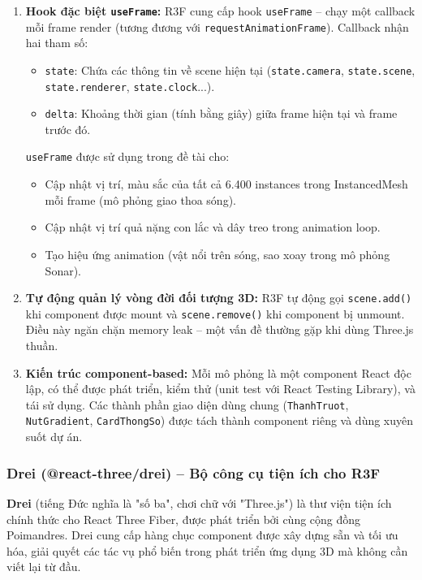 \begin{enumerate}
    \item \textbf{Hook đặc biệt \texttt{useFrame}:} R3F cung cấp hook \texttt{useFrame} – chạy một callback mỗi frame render (tương đương với \texttt{requestAnimationFrame}). Callback nhận hai tham số:
    \begin{itemize}
        \item \texttt{state}: Chứa các thông tin về scene hiện tại (\texttt{state.camera}, \texttt{state.scene}, \texttt{state.renderer}, \texttt{state.clock}...).
        \item \texttt{delta}: Khoảng thời gian (tính bằng giây) giữa frame hiện tại và frame trước đó.
    \end{itemize}
    \texttt{useFrame} được sử dụng trong đề tài cho:
    \begin{itemize}
        \item Cập nhật vị trí, màu sắc của tất cả 6.400 instances trong InstancedMesh mỗi frame (mô phỏng giao thoa sóng).
        \item Cập nhật vị trí quả nặng con lắc và dây treo trong animation loop.
        \item Tạo hiệu ứng animation (vật nổi trên sóng, sao xoay trong mô phỏng Sonar).
    \end{itemize}
    
    \item \textbf{Tự động quản lý vòng đời đối tượng 3D:} R3F tự động gọi \texttt{scene.add()} khi component được mount và \texttt{scene.remove()} khi component bị unmount. Điều này ngăn chặn memory leak – một vấn đề thường gặp khi dùng Three.js thuần.
    
    \item \textbf{Kiến trúc component-based:} Mỗi mô phỏng là một component React độc lập, có thể được phát triển, kiểm thử (unit test với React Testing Library), và tái sử dụng. Các thành phần giao diện dùng chung (\texttt{ThanhTruot}, \texttt{NutGradient}, \texttt{CardThongSo}) được tách thành component riêng và dùng xuyên suốt dự án.
\end{enumerate}

\subsubsection{Drei (@react-three/drei) – Bộ công cụ tiện ích cho R3F}

\textbf{Drei} (tiếng Đức nghĩa là "số ba", chơi chữ với "Three.js") là thư viện tiện ích chính thức cho React Three Fiber, được phát triển bởi cùng cộng đồng Poimandres. Drei cung cấp hàng chục component được xây dựng sẵn và tối ưu hóa, giải quyết các tác vụ phổ biến trong phát triển ứng dụng 3D mà không cần viết lại từ đầu.

